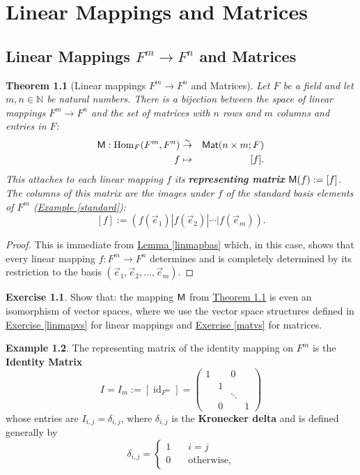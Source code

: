\documentclass[11pt]{amsbook}
\DeclareMathOperator{\id}{\mathrm{id}}
\newtheorem{theorem}{Theorem}[section]
\theoremstyle{definition}
\newtheorem{ex}[theorem]{Example}
\newtheorem{exercise}{Exercise}
\begin{document}
\chapter{Linear Mappings and Matrices} \label{chap2}

\section{Linear Mappings $F^m\to F^n$ and Matrices} \label{linmat}
\begin{theorem}[Linear mappings $F^m\to F^n$ and Matrices] \label{linmapmat} Let $F$ be a field and let $m,n\in \mathbb{N}$ be natural numbers. There is a bijection between the space of linear mappings $F^m \to F^n$ and the set of matrices  with $n$ rows and $m$ columns and entries in $F$:
\begin{eqnarray*}{\sf M}: {\rm Hom}_F(F^m, F^n) &\stackrel{\sim}{\to}& {\sf Mat}(n\times m; F) \\ f&\mapsto& [f].\end{eqnarray*} This attaches to each linear mapping $f$ its {\bf representing matrix} ${\sf M}(f) := [f]$. The columns of this matrix are the images under $f$ of the standard basis elements of $F^m$ (\hyperref[standard]{Example \ref{standard}}):$$[f] := ( f({\vec e}_1) | f({\vec e}_2) | \cdots | f({\vec e}_m )).$$
\end{theorem}
\begin{proof}
This is immediate from \hyperref[linmapbas]{Lemma \ref{linmapbas}} which, in this case, shows that every linear mapping $f: F^m\to F^n$ determines and is completely determined by its restriction to the basis $({\vec e}_1, {\vec e}_2, \ldots , {\vec e}_m)$.
\end{proof}

\begin{exercise} Show that: the mapping ${\sf M}$ from \hyperref[linmapmat]{Theorem \ref{linmapmat}} is even an isomorphism of vector spaces, where we use the vector space structures defined in \hyperref[linmapvs]{Exercise \ref{linmapvs}} for linear mappings and \hyperref[matvs]{Exercise \ref{matvs}} for matrices.
\end{exercise}

\begin{ex} \label{kronecker} The representing matrix of the identity mapping on $F^m$ is the {\bf Identity Matrix} $$I = I_m := [\id_{F^m}] = \begin{pmatrix} 1 & & 0 & \\ & 1& & \\ & & \ddots & \\ & 0 & & 1\end{pmatrix}$$ whose entries are $I_{i,j} = \delta_{i,j}$, where $\delta_{i,j}$ is the {\bf Kronecker delta} and is defined generally by $$\delta_{i,j} = \begin{cases} 1 \quad & i=j \\ 0 & \text{otherwise}, \end{cases}$$
\end{ex}
\end{document}
